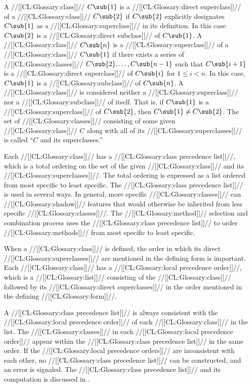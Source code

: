 A //[[CL:Glossary:class]]// $C\sub{1}$ is 
a //[[CL:Glossary:direct superclass]]// of a //[[CL:Glossary:class]]// $C\sub{2}$
if $C\sub{2}$ explicitly designates $C\sub{1}$ 
as a //[[CL:Glossary:superclass]]// in its definition.
In this case $C\sub{2}$ is a //[[CL:Glossary:direct subclass]]// of $C\sub{1}$.
A //[[CL:Glossary:class]]// $C\sub{n}$ is a //[[CL:Glossary:superclass]]// of 
a //[[CL:Glossary:class]]// $C\sub{1}$ if there exists a series of
//[[CL:Glossary:classes]]// $C\sub{2},\ldots,C\sub{n-1}$ such that 
$C\sub{i+1}$ is a //[[CL:Glossary:direct superclass]]// of $C\sub{i}$ for $1 \leq i<n$.
In this case, $C\sub{1}$ is a //[[CL:Glossary:subclass]]// of $C\sub{n}$.
A //[[CL:Glossary:class]]// is considered neither a //[[CL:Glossary:superclass]]// nor a //[[CL:Glossary:subclass]]// of itself.
That is, if $C\sub{1}$ is a //[[CL:Glossary:superclass]]// of $C\sub{2}$, 
then $C\sub{1} \neq C\sub{2}$.
The set of //[[CL:Glossary:classes]]// consisting of some given //[[CL:Glossary:class]]// $C$ 
along with all of its //[[CL:Glossary:superclasses]]// is called ``$C$ and its superclasses.''

Each //[[CL:Glossary:class]]// has a //[[CL:Glossary:class precedence list]]//,
which is a total ordering on the set of the given //[[CL:Glossary:class]]// and its //[[CL:Glossary:superclasses]]//.
The total ordering is expressed as a list ordered from most specific to least specific.
The //[[CL:Glossary:class precedence list]]// is used in several ways.  In general, more
specific //[[CL:Glossary:classes]]// can //[[CL:Glossary:shadow]]// features that would
otherwise be inherited from less specific //[[CL:Glossary:classes]]//.
The //[[CL:Glossary:method]]// selection and combination process uses 
the //[[CL:Glossary:class precedence list]]// to order //[[CL:Glossary:methods]]// 
from most specific to least specific. 
 
When a //[[CL:Glossary:class]]// is defined, the order in which its direct //[[CL:Glossary:superclasses]]//
are mentioned in the defining form is important.  Each //[[CL:Glossary:class]]// has a
//[[CL:Glossary:local precedence order]]//, which is a //[[CL:Glossary:list]]// consisting of the
//[[CL:Glossary:class]]// followed by its //[[CL:Glossary:direct superclasses]]// in the order mentioned
in the defining //[[CL:Glossary:form]]//.

A //[[CL:Glossary:class precedence list]]// is always consistent with the
//[[CL:Glossary:local precedence order]]// of each //[[CL:Glossary:class]]// in the list.  
The //[[CL:Glossary:classes]]// in each //[[CL:Glossary:local precedence order]]// appear
within the //[[CL:Glossary:class precedence list]]// in the same order.  
If the //[[CL:Glossary:local precedence orders]]// are inconsistent with each other, 
no //[[CL:Glossary:class precedence list]]// can be constructed, and an error is signaled.
The //[[CL:Glossary:class precedence list]]// and its computation is discussed
in \secref\DeterminingtheCPL.

